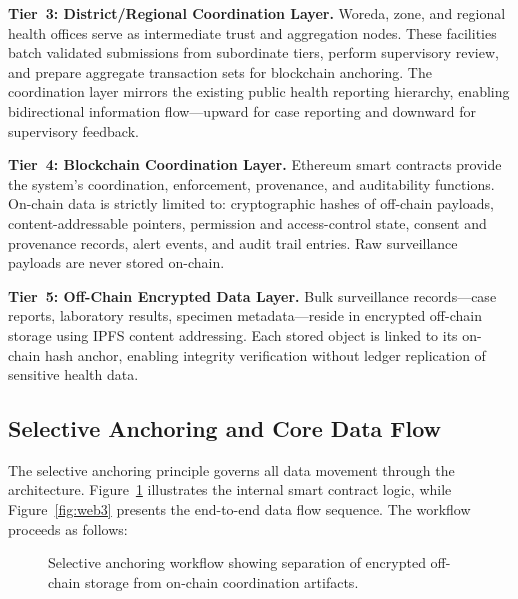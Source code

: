 \documentclass[AMA,LATO1COL]{WileyNJD-v2}
\begin{document}
\textbf{Tier~3: District/Regional Coordination Layer.} Woreda, zone, and regional health offices serve as intermediate trust and aggregation nodes. These facilities batch validated submissions from subordinate tiers, perform supervisory review, and prepare aggregate transaction sets for blockchain anchoring. The coordination layer mirrors the existing public health reporting hierarchy, enabling bidirectional information flow---upward for case reporting and downward for supervisory feedback.

\textbf{Tier~4: Blockchain Coordination Layer.} Ethereum smart contracts provide the system's coordination, enforcement, provenance, and auditability functions. On-chain data is strictly limited to: cryptographic hashes of off-chain payloads, content-addressable pointers, permission and access-control state, consent and provenance records, alert events, and audit trail entries. Raw surveillance payloads are never stored on-chain.

\textbf{Tier~5: Off-Chain Encrypted Data Layer.} Bulk surveillance records---case reports, laboratory results, specimen metadata---reside in encrypted off-chain storage using IPFS content addressing. Each stored object is linked to its on-chain hash anchor, enabling integrity verification without ledger replication of sensitive health data.

\subsection{Selective Anchoring and Core Data Flow}\label{subsec:dataflow}

The selective anchoring principle governs all data movement through the architecture. Figure~\ref{fig:smartcontract} illustrates the internal smart contract logic, while Figure~\ref{fig:web3} presents the end-to-end data flow sequence. The workflow proceeds as follows:

\begin{figure}[!ht]
\centering
{}
\caption{Selective anchoring workflow showing separation of encrypted off-chain storage from on-chain coordination artifacts.}\label{fig:smartcontract}
\end{figure}
\end{document}

